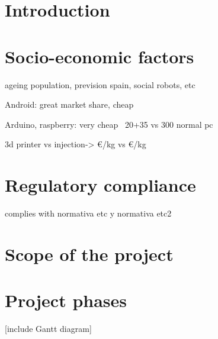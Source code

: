 \section{Introduction}




\section{Socio-economic factors}

ageing population, prevision spain, social robots, etc


Android: great market share, cheap

Arduino, raspberry: very cheap ~20+35  vs 300 normal pc

3d printer vs injection-> €/kg vs €/kg




\section{Regulatory compliance}

complies with normativa etc y normativa etc2

\section{Scope of the project}

\section{Project phases}
[include Gantt diagram]




